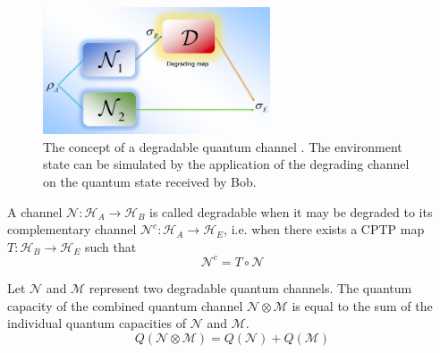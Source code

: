 \begin{figure}[H]
    \centering
    \includegraphics[width=0.6\textwidth]{figures/degradable_quantum_channel.png}
    \caption{The concept of a degradable quantum channel \cite{Gyongyosi2012PropertiesOT}. The environment state can be simulated by the application of the degrading channel on the quantum state received by Bob.}
\end{figure}

\begin{definition}
A channel $\mathcal{N}: \mathcal{H}_A \rightarrow \mathcal{H}_B$ is called degradable when it may be degraded to its complementary channel $\mathcal{N}^c: \mathcal{H}_A \rightarrow \mathcal{H}_E$, i.e. when there exists a CPTP map $T: \mathcal{H}_B \rightarrow \mathcal{H}_E$ such that
$$\mathcal{N}^c = T \circ \mathcal{N}$$
\end{definition}

\begin{theorem}
Let $\mathcal{N}$ and $\mathcal{M}$ represent two degradable quantum channels. The quantum capacity of the combined quantum channel $\mathcal{N} \otimes \mathcal{M}$ is equal to the sum of the individual quantum capacities of $\mathcal{N}$ and $\mathcal{M}$.
$$Q(\mathcal{N} \otimes \mathcal{M}) = Q(\mathcal{N}) + Q(\mathcal{M})$$
\end{theorem}

